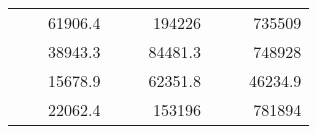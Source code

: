 \begin{table}[H]
\begin{tabular}{|ccrccrccc}
\rowcolor[HTML]{DDFDFF} 
\multicolumn{1}{|c|}{\cellcolor[HTML]{FFFFC7}}                                & \multicolumn{1}{c|}{\cellcolor[HTML]{DDFDFF}}                      & \multicolumn{1}{r|}{\cellcolor[HTML]{DAE8FC}61906.4}   & \multicolumn{1}{c|}{\cellcolor[HTML]{FFFFC7}}                                & \multicolumn{1}{c|}{\cellcolor[HTML]{DDFDFF}}                       & \multicolumn{1}{r|}{\cellcolor[HTML]{DDFDFF}194226}    & \multicolumn{1}{c|}{\cellcolor[HTML]{FFFFC7}}                                & \multicolumn{1}{c|}{\cellcolor[HTML]{DDFDFF}}                      & \multicolumn{1}{r|}{\cellcolor[HTML]{DDFDFF}735509}    \\ \cline{3-3} \cline{6-6} \cline{9-9} 
\multicolumn{1}{|c|}{\cellcolor[HTML]{FFFFC7}}                                & \multicolumn{1}{c|}{\cellcolor[HTML]{DDFDFF}}                      & \multicolumn{1}{r|}{\cellcolor[HTML]{DDFDFF}38943.3}   & \multicolumn{1}{c|}{\cellcolor[HTML]{FFFFC7}}                                & \multicolumn{1}{c|}{\cellcolor[HTML]{DDFDFF}}                       & \multicolumn{1}{r|}{\cellcolor[HTML]{DAE8FC}84481.3}   & \multicolumn{1}{c|}{\cellcolor[HTML]{FFFFC7}}                                & \multicolumn{1}{c|}{\cellcolor[HTML]{DDFDFF}}                      & \multicolumn{1}{r|}{\cellcolor[HTML]{DAE8FC}748928}    \\ \cline{3-3} \cline{6-6} \cline{9-9} 
\rowcolor[HTML]{DDFDFF} 
\multicolumn{1}{|c|}{\cellcolor[HTML]{FFFFC7}}                                & \multicolumn{1}{c|}{\cellcolor[HTML]{DDFDFF}}                      & \multicolumn{1}{r|}{\cellcolor[HTML]{DAE8FC}15678.9}   & \multicolumn{1}{c|}{\cellcolor[HTML]{FFFFC7}}                                & \multicolumn{1}{c|}{\cellcolor[HTML]{DDFDFF}}                       & \multicolumn{1}{r|}{\cellcolor[HTML]{DDFDFF}62351.8}   & \multicolumn{1}{c|}{\cellcolor[HTML]{FFFFC7}}                                & \multicolumn{1}{c|}{\cellcolor[HTML]{DDFDFF}}                      & \multicolumn{1}{r|}{\cellcolor[HTML]{DDFDFF}46234.9}   \\ \cline{3-3} \cline{6-6} \cline{9-9} 
\multicolumn{1}{|c|}{\cellcolor[HTML]{FFFFC7}}                                & \multicolumn{1}{c|}{\cellcolor[HTML]{DDFDFF}}                      & \multicolumn{1}{r|}{\cellcolor[HTML]{DDFDFF}22062.4}   & \multicolumn{1}{c|}{\cellcolor[HTML]{FFFFC7}}                                & \multicolumn{1}{c|}{\cellcolor[HTML]{DDFDFF}}                       & \multicolumn{1}{r|}{\cellcolor[HTML]{DAE8FC}153196}    & \multicolumn{1}{c|}{\cellcolor[HTML]{FFFFC7}}                                & \multicolumn{1}{c|}{\cellcolor[HTML]{DDFDFF}}                      & \multicolumn{1}{r|}{\cellcolor[HTML]{DAE8FC}781894}    \\ \cline{3-3} \cline{6-6} \cline{9-9} 

\end{tabular}
\end{table}
